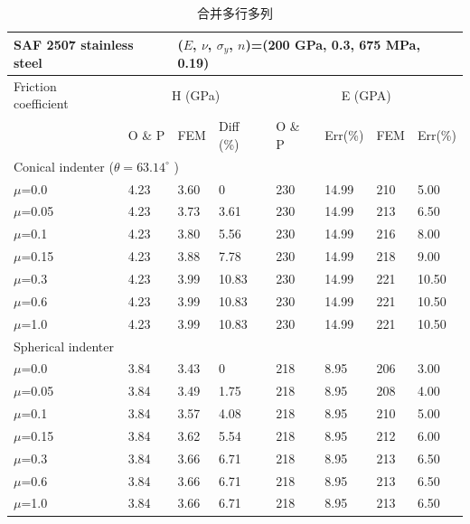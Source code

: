 \documentclass[fancyhdr,adobefonts,oneside,hyperref,openany,a4paper,UTF8]{ctexbook}
\begin{document}
\begin{table}[htp]
   \begin{center}
   \caption{\label{tab:complicate}合并多行多列}
\begin{tabular}{l l l l l l l l }

\hline
\multicolumn{2}{l}{SAF 2507 stainless steel} & \multicolumn{6}{l}{($E$, $\nu$, $\sigma_y$, $n$)=(200 GPa, 0.3, 675 MPa, 0.19) } \\
\hline
  Friction coefficient
  & \multicolumn{3}{c}{H (GPa)} & \multicolumn{4}{c}{E (GPA) } \\
  \cline{2-8}
   & {O \& P} & {FEM} & {Diff (\%)} & {O \& P} & {Err(\%)} & {FEM} & {Err(\%)}  \\
  \cline{2-8}
\multicolumn{8}{l}{Conical indenter ($\theta =63.14^\circ $ )} \\
  $\mu$=0.0  & 4.23 & 3.60 & 0     & 230 & 14.99 & 210 & 5.00   \\
  $\mu$=0.05 & 4.23 & 3.73 & 3.61  & 230 & 14.99 & 213 & 6.50 \\
  $\mu$=0.1  & 4.23 & 3.80 & 5.56  & 230 & 14.99 & 216 & 8.00 \\
  $\mu$=0.15 & 4.23 & 3.88 & 7.78  & 230 & 14.99 & 218 & 9.00 \\
  $\mu$=0.3  & 4.23 & 3.99 & 10.83 & 230 & 14.99 & 221 & 10.50 \\
  $\mu$=0.6  & 4.23 & 3.99 & 10.83 & 230 & 14.99 & 221 & 10.50 \\
  $\mu$=1.0  & 4.23 & 3.99 & 10.83 & 230 & 14.99 & 221 & 10.50 \\
\hline
\multicolumn{8}{l}{Spherical indenter} \\
   $\mu$=0.0  & 3.84 & 3.43 & 0    & 218 & 8.95 & 206 & 3.00 \\
   $\mu$=0.05 & 3.84 & 3.49 & 1.75 & 218 & 8.95 & 208 & 4.00 \\
   $\mu$=0.1  & 3.84 & 3.57 & 4.08 & 218 & 8.95 & 210 & 5.00 \\
   $\mu$=0.15 & 3.84 & 3.62 & 5.54 & 218 & 8.95 & 212 & 6.00 \\
   $\mu$=0.3  & 3.84 & 3.66 & 6.71 & 218 & 8.95 & 213 & 6.50 \\
   $\mu$=0.6  & 3.84 & 3.66 & 6.71 & 218 & 8.95 & 213 & 6.50 \\
   $\mu$=1.0  & 3.84 & 3.66 & 6.71 & 218 & 8.95 & 213 & 6.50 \\
\hline
\end{tabular}
\end{center}
\end{table}
\end{document}
